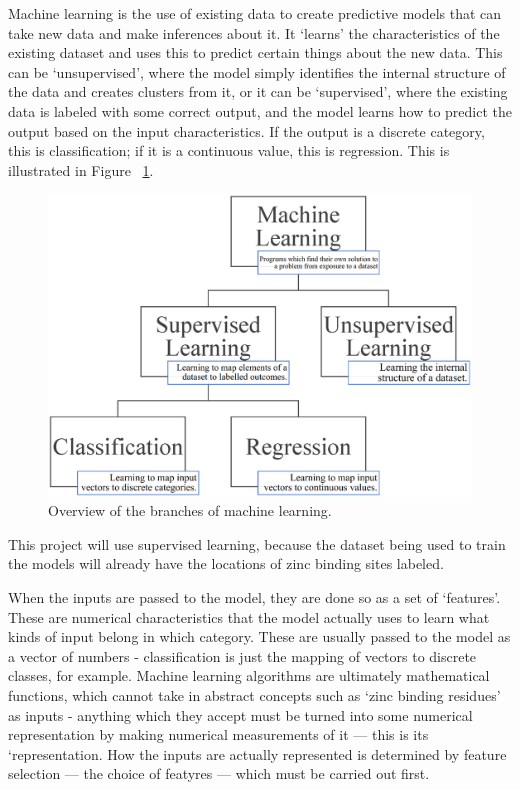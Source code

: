 Machine learning is the use of existing data to create predictive models that can take new data and make inferences about it. It `learns' the characteristics of the existing dataset and uses this to predict certain things about the new data. This can be `unsupervised', where the model simply identifies the internal structure of the data and creates clusters from it, or it can be `supervised', where the existing data is labeled with some correct output, and the model learns how to predict the output based on the input characteristics. If the output is a discrete category, this is classification; if it is a continuous value, this is regression. This is illustrated in Figure ~\ref{fig:machine-learning}.

\begin{figure}
\centering
\includegraphics[width=1.0\textwidth]{Figures/machine-learning.eps}
\caption{\label{fig:machine-learning} Overview of the branches of machine learning.}
\end{figure}

This project will use supervised learning, because the dataset being used to train the models will already have the locations of zinc binding sites labeled. 


When the inputs are passed to the model, they are done so as a set of `features'. These are numerical characteristics that the model actually uses to learn what kinds of input belong in which category. These are usually passed to the model as a vector of numbers - classification is just the mapping of vectors to discrete classes, for example. Machine learning algorithms are ultimately mathematical functions, which cannot take in abstract concepts such as `zinc binding residues' as inputs - anything which they accept must be turned into some numerical representation by making numerical measurements of it --- this is its `representation. How the inputs are actually represented is determined by feature selection --- the choice of featyres --- which must be carried out first.

